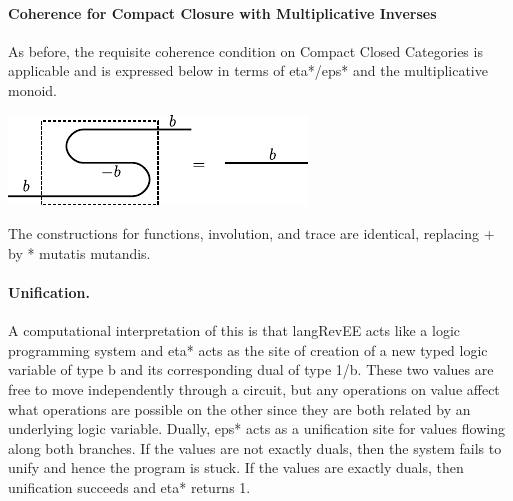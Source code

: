 \documentclass[preprint]{sigplanconf}
\begin{document}
\begin{multicols}{2}
\begin{center}
\end{center}

\begin{center}
\end{center}  
\end{multicols}

\paragraph*{Coherence for Compact Closure with Multiplicative Inverses} 
As before, the requisite coherence condition on Compact Closed
Categories is applicable and is expressed below in terms of
{{eta*}}/{{eps*}} and the multiplicative monoid.

\begin{center}
  \includegraphics{diagrams/coherence.pdf}
\end{center}

The constructions for functions, involution, and trace are identical,
replacing {{+}} by {{*}} mutatis mutandis.


\paragraph*{Unification.}
A computational interpretation of this is that {{langRevEE}} acts like
a logic programming system and {{eta*}} acts as the site of creation
of a new typed logic variable of type {{b}} and its corresponding dual
of type {{1/b}}. These two values are free to move independently
through a circuit, but any operations on value affect what operations
are possible on the other since they are both related by an underlying
logic variable. Dually, {{eps*}} acts as a unification site for values
flowing along both branches. If the values are not exactly duals, then
the system fails to unify and hence the program is stuck. If the
values are exactly duals, then unification succeeds and {{eta*}}
returns {{1}}.
\end{document}
